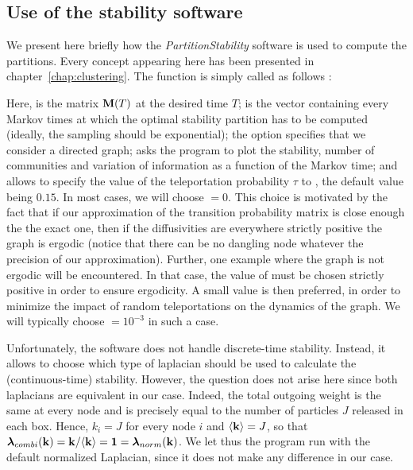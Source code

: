 \subsection{Use of the stability software}
We present here briefly how the \textit{PartitionStability} software is used to compute the partitions. Every concept appearing here has been presented in chapter~\ref{chap:clustering}. The  function is simply called as follows : \vspace{-.2cm}
\begin{center}
\end{center} %
Here,  is the matrix $\mathbf M(T)$ at the desired time $T$;  is the vector containing every Markov times at which the optimal stability partition has to be computed (ideally, the sampling should be exponential); the  option specifies that we consider a directed graph;  asks the program to plot the stability, number of communities and variation of information as a function of the Markov time; and  allows to specify the value of the teleportation probability $\tau$ to , the default value being $0.15$. In most cases, we will choose  $= 0$. This choice is motivated by the fact that if our approximation of the transition probability matrix is close enough the the exact one, then if the diffusivities are everywhere strictly positive the graph is ergodic (notice that there can be no dangling node whatever the precision of our approximation). Further, one example where the graph is not ergodic will be encountered. In that case, the value of  must be chosen strictly positive in order to ensure ergodicity. A small value is then preferred, in order to minimize the impact of random teleportations on the dynamics of the graph. We will typically choose  $=10^{-3}$ in such a case.

Unfortunately, the software does not handle discrete-time stability. Instead, it allows to choose which type of laplacian should be used to calculate the (continuous-time) stability. However, the question does not arise here since both laplacians are equivalent in our case. Indeed, the total outgoing weight is the same at every node and is precisely equal to the number of particles $J$ released in each box. Hence, $k_i = J$ for every node $i$ and $\langle \mathbf k \rangle = J$, so that $\boldsymbol \lambda_{combi}(\mathbf k) = \mathbf k/ \langle \mathbf k \rangle = \mathbf 1 = \boldsymbol \lambda_{norm}(\mathbf k)$. We let thus the program run with the default normalized Laplacian, since it does not make any difference in our case.

